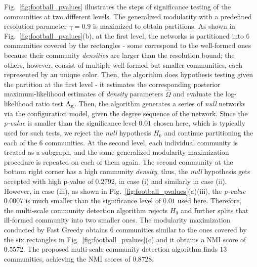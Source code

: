 Fig.~\ref{fig:football_pvalues} illustrates the steps of significance testing of the communities at two different levels. The generalized modularity with a predefined resolution parameter $\gamma=0.9$ is maximized to obtain partitions. As shown in Fig.~\ref{fig:football_pvalues}(b), at the first level, the networks is partitioned into 6 communities covered by the rectangles - some correspond to the well-formed ones because their community {\it densities} are larger than the resolution bound; the others, however, consist of multiple well-formed but smaller communities, each represented by an unique color. Then, the algorithm does hypothesis testing given the partition at the first level - it estimates the corresponding posterior maximum-likelihood estimates of {\it density} parameters $\hat{\Omega}$ and evaluate the log-likelihood ratio test $\Lambda_{\bf g}$. Then, the algorithm generates a series of \textit{null} networks via the configuration model, given the degree sequence of the network. Since the {\it p-value} is smaller than the significance level $0.01$ chosen here, which is typically used for such tests, we reject the {\it null} hypothesis $H_0$ and continue partitioning the each of the 6 communities. At the second level, each individual community is treated as a subgraph, and the same generalized modularity maximization procedure is repeated on each of them again.
The second community at the bottom right corner has a high community {\it density}, thus, the {\it null} hypothesis gets accepted with high p-value of $0.2792$, in case (i) and similarly in case (ii).
However, in case (iii), as shown in Fig.~\ref{fig:football_pvalues}(a)(iii), the {\it p-value} $0.0007$ is much smaller than the significance level of $0.01$ used here. Therefore, the multi-scale community detection algorithm rejects $H_0$ and further splits that ill-formed community into two smaller ones. The modularity maximization conducted by Fast Greedy obtains 6 communities similar to the ones covered by the six rectangles in Fig.~\ref{fig:football_pvalues}(c) and it obtains a NMI score of $0.5572$. The proposed multi-scale community detection algorithm finds $13$ communities, achieving the NMI scores of $0.8728$.


